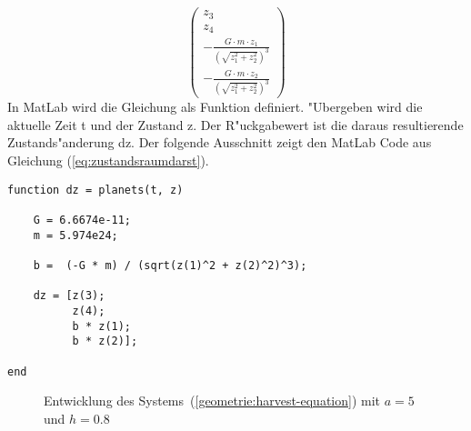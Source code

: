 \begin{refsection}
\begin{equation}
\begin{pmatrix}
z_3 \\ 
z_4 \\
-\frac{G \cdot m \cdot z_1}{(\sqrt{z_1^2 + z_2^2})^3} \\
-\frac{G \cdot m \cdot z_2}{(\sqrt{z_1^2 + z_2^2})^3}
\end{pmatrix}
\end{equation}
In MatLab wird die Gleichung als Funktion definiert.
"Ubergeben wird die aktuelle Zeit t und der Zustand z.
Der R"uckgabewert ist die daraus resultierende  Zustands"anderung dz.
Der folgende Ausschnitt zeigt den MatLab Code aus Gleichung (\ref{eq:zustandsraumdarst}).
\begin{lstlisting}[style=Matlab]
function dz = planets(t, z)

    G = 6.6674e-11;
    m = 5.974e24;

    b =  (-G * m) / (sqrt(z(1)^2 + z(2)^2)^3);
    
    dz = [z(3);
          z(4);
          b * z(1);
          b * z(2)];
      
end
\end{lstlisting}
\begin{figure}
\centering
\caption{Entwicklung des Systems~(\ref{geometrie:harvest-equation})
mit $a=5$ und $h=0.8$
\label{geometrie:harvest-graph}}
\end{figure}%
\end{refsection}

